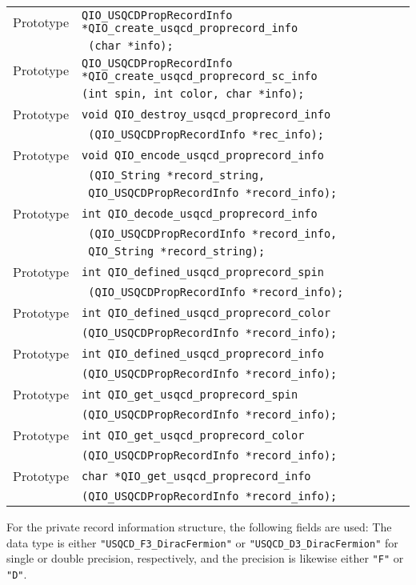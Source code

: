 \documentclass{article}
\begin{document}
\begin{flushleft}
  \begin{tabular}{|l|l|}
  \hline
  Prototype      & \verb|QIO_USQCDPropRecordInfo *QIO_create_usqcd_proprecord_info|\\
                 & \verb| (char *info);|\\
  Prototype      & \verb|QIO_USQCDPropRecordInfo *QIO_create_usqcd_proprecord_sc_info|\\
                 & \verb|(int spin, int color, char *info);|\\
  Prototype      & \verb|void QIO_destroy_usqcd_proprecord_info|\\
               & \verb| (QIO_USQCDPropRecordInfo *rec_info);|\\
Prototype      & \verb|void QIO_encode_usqcd_proprecord_info|\\
               & \verb| (QIO_String *record_string, |\\
               & \verb| QIO_USQCDPropRecordInfo *record_info);|\\
Prototype      & \verb|int QIO_decode_usqcd_proprecord_info|\\
               & \verb| (QIO_USQCDPropRecordInfo *record_info,|\\
               & \verb| QIO_String *record_string);|\\
Prototype      & \verb|int QIO_defined_usqcd_proprecord_spin|\\
               & \verb| (QIO_USQCDPropRecordInfo *record_info);|\\
Prototype      & \verb|int QIO_defined_usqcd_proprecord_color|\\
               & \verb|(QIO_USQCDPropRecordInfo *record_info);|\\
Prototype      & \verb|int QIO_defined_usqcd_proprecord_info|\\
               & \verb|(QIO_USQCDPropRecordInfo *record_info);|\\
Prototype      & \verb|int QIO_get_usqcd_proprecord_spin|\\
               & \verb|(QIO_USQCDPropRecordInfo *record_info);|\\
Prototype      & \verb|int QIO_get_usqcd_proprecord_color|\\
               & \verb|(QIO_USQCDPropRecordInfo *record_info);|\\
Prototype      & \verb|char *QIO_get_usqcd_proprecord_info|\\
               & \verb|(QIO_USQCDPropRecordInfo *record_info);|\\
  \hline
 \end{tabular}
\end{flushleft}
%

For the private record information structure, the following fields are
used: The data type is either \verb|"USQCD_F3_DiracFermion"| or
\verb|"USQCD_D3_DiracFermion"| for single or double precision,
respectively, and the precision is likewise either \verb|"F"| or
\verb|"D"|.
\end{document}
